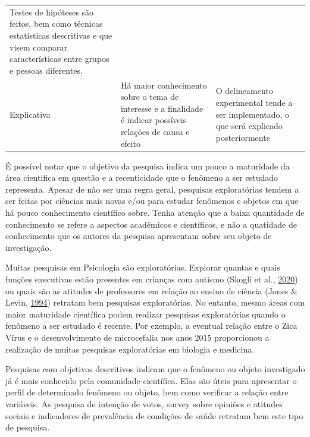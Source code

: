 \documentclass[
]{book}
\begin{document}
\begin{longtable}[]{@{}lll@{}}
\begin{minipage}[t]{0.30\columnwidth}
Testes de hipóteses são feitos, bem como técnicas estatísticas
descritivas e que visem comparar características entre grupos e pessoas
diferentes.\strut
\end{minipage}\tabularnewline
\begin{minipage}[t]{0.30\columnwidth}\raggedright
Explicativa\strut
\end{minipage} & \begin{minipage}[t]{0.30\columnwidth}\raggedright
Há maior conhecimento sobre o tema de interesse e a finalidade é indicar
possíveis relações de causa e efeito\strut
\end{minipage} & \begin{minipage}[t]{0.30\columnwidth}\raggedright
O delineamento experimental tende a ser implementado, o que será
explicado posteriormente\strut
\end{minipage}\tabularnewline
\bottomrule
\end{longtable}

É possível notar que o objetivo da pesquisa indica um pouco a maturidade
da área cientifica em questão e a recenticidade que o fenômeno a ser
estudado representa. Apesar de não ser uma regra geral, pesquisas
exploratórias tendem a ser feitas por ciências mais novas e/ou para
estudar fenômenos e objetos em que há pouco conhecimento científico
sobre. Tenha atenção que a baixa quantidade de conhecimento se refere a
aspectos acadêmicos e científicos, e não a quatidade de conhecimento que
os autores da pesquisa apresentam sobre seu objeto de investigação.

Muitas pesquisas em Psicologia são exploratórias. Explorar quantas e
quais funções executivas estão presentes em crianças com autismo (Skogli
et al., \protect\hyperlink{ref-Skogli2020}{2020}) ou quais são as
atitudes de professores em relação ao ensino de ciência (Jones \& Levin,
\protect\hyperlink{ref-Jones1994}{1994}) retratam bem pesquisas
exploratórias. No entanto, mesmo áreas com maior maturidade científica
podem realizar pesquisas exploratórias quando o fenômeno a ser estudado
é recente. Por exemplo, a eventual relação entre o Zica Vírus e o
desenvolvimento de microcefalia nos anos 2015 proporcionou a realização
de muitas pesquisas exploratórias em biologia e medicina.

Pesquisas com objetivos descritivos indicam que o fenômeno ou objeto
investigado já é mais conhecido pela comunidade científica. Elas são
úteis para apresentar o perfil de determinado fenômeno ou objeto, bem
como verificar a relação entre variáveis. As pesquisa de intenção de
votos, survey sobre opiniões e atitudes sociais e indicadores de
prevalência de condições de saúde retratam bem este tipo de pesquisa.
\end{document}
